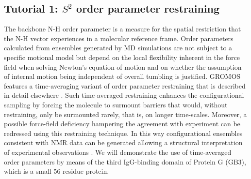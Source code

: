 
\subsection{Tutorial 1: $S^2$ order parameter restraining}
The backbone N-H order parameter is a measure for the spatial restriction that the N-H vector experiences in a molecular reference frame. 
Order parameters calculated from ensembles generated by MD simulations are not subject to a specific motional model but depend on the 
local flexibility inherent in the force field when solving Newton's equation of motion and on whether the assumption of internal motion 
being independent of overall tumbling is justified. 
GROMOS features a time-averaging variant of order parameter restraining that is described in detail elsewhere \cite{Hansen_S2_2014}. 
Such time-averaged restraining enhances the configurational sampling by forcing the molecule to surmount barriers that would, without restraining, only be surmounted rarely, 
that is, on longer time-scales. Moreover, a possible force-field deficiency hampering the agreement with experiment can be redressed using this restraining technique. 
In this way configurational ensembles consistent with NMR data can be generated allowing a structural interpretation of experimental observations \cite{Smith_2017,Smith_2021}.
We will demonstrate the use of time-averaged order parameters by means of the third IgG-binding domain of Protein G (GB3), which is a small 56-residue protein.

